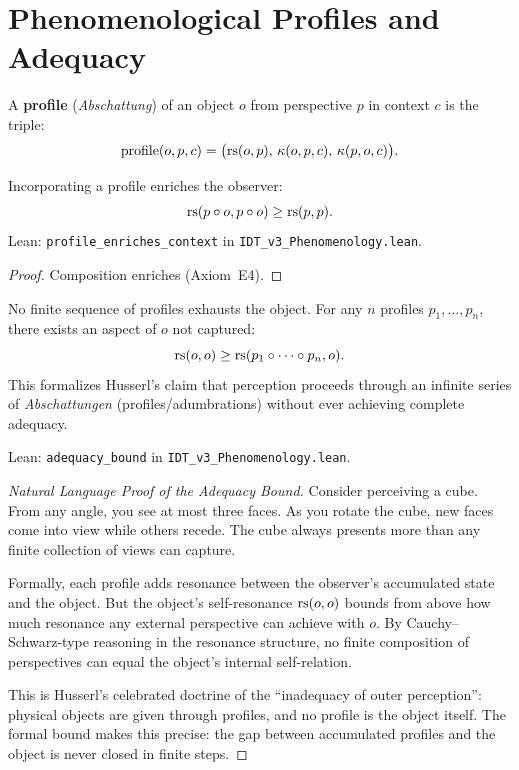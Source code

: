 \section{Phenomenological Profiles and Adequacy}

\begin{definition}
\label{def:phenom-profile}
A \textbf{profile} (\textit{Abschattung}) of an object $o$ from perspective $p$
in context $c$ is the triple:
\[
\mathrm{profile}(o, p, c) = \bigl(\mathrm{rs}(o, p),\, \kappa(o, p, c),\, \kappa(p, o, c)\bigr).
\]
\end{definition}

\begin{theorem}
\label{thm:profile-enriches}
Incorporating a profile enriches the observer:
\[
\mathrm{rs}(p \circ o, p \circ o) \geq \mathrm{rs}(p, p).
\]
Lean: \texttt{profile\_enriches\_context} in \texttt{IDT\_v3\_Phenomenology.lean}.
\end{theorem}

\begin{proof}
Composition enriches (Axiom~E4).
\end{proof}

\begin{theorem}
\label{thm:adequacy-bound}
No finite sequence of profiles exhausts the object.  For any $n$ profiles
$p_1, \ldots, p_n$, there exists an aspect of $o$ not captured:
\[
\mathrm{rs}(o, o) \geq \mathrm{rs}(p_1 \circ \cdots \circ p_n, o).
\]
This formalizes Husserl's claim that perception proceeds through an infinite
series of \textit{Abschattungen} (profiles/adumbrations) without ever
achieving complete adequacy.

Lean: \texttt{adequacy\_bound} in \texttt{IDT\_v3\_Phenomenology.lean}.
\end{theorem}

\begin{proof}[Natural Language Proof of the Adequacy Bound]
Consider perceiving a cube.  From any angle, you see at most three faces.
As you rotate the cube, new faces come into view while others recede.
The cube always presents more than any finite collection of views can
capture.

Formally, each profile adds resonance between the observer's accumulated
state and the object.  But the object's self-resonance $\mathrm{rs}(o, o)$ bounds
from above how much resonance any external perspective can achieve with $o$.
By Cauchy--Schwarz-type reasoning in the resonance structure, no finite
composition of perspectives can equal the object's internal self-relation.

This is Husserl's celebrated doctrine of the ``inadequacy of outer
perception'': physical objects are given through profiles, and no profile
is the object itself.  The formal bound makes this precise: the gap
between accumulated profiles and the object is never closed in finite
steps.
\end{proof}

